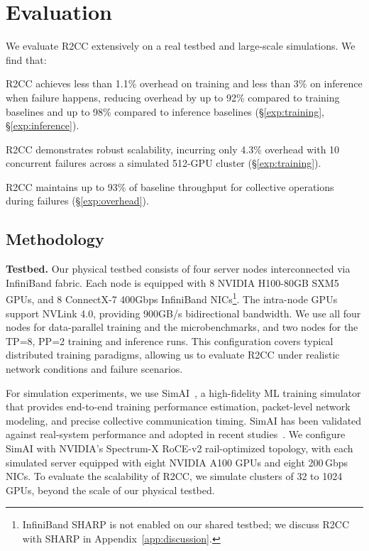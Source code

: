 \section{Evaluation}

We evaluate R2CC extensively on a real testbed and large-scale simulations. We find that:
\begin{packeditemize}
    \item R2CC achieves less than 1.1\% overhead on training and less than 3\% on inference when failure happens, reducing overhead by up to 92\% compared to training baselines and up to 98\% compared to inference baselines (§\ref{exp:training}, §\ref{exp:inference}).
    \item R2CC demonstrates robust scalability, incurring only 4.3\% overhead with 10 concurrent failures across a simulated 512-GPU cluster (§\ref{exp:training}).
    \item R2CC maintains up to 93\% of baseline throughput for collective operations during failures (§\ref{exp:overhead}).
\end{packeditemize}

\subsection{Methodology}
\label{sec:setup}
\textbf{Testbed.} Our physical testbed consists of four server nodes interconnected via InfiniBand fabric. Each node is equipped with 8 NVIDIA H100-80GB SXM5 GPUs, and 8 ConnectX-7 400Gbps InfiniBand NICs\footnote{InfiniBand SHARP is not enabled on our shared testbed; we discuss R2CC with SHARP in Appendix~\ref{app:discussion}.}. The intra-node GPUs support NVLink 4.0, providing 900GB/s bidirectional bandwidth. We use all four nodes for data-parallel training and the microbenchmarks, and two nodes for the TP=8, PP=2 training and inference runs. This configuration covers typical distributed training paradigms, allowing us to evaluate R2CC under realistic network conditions and failure scenarios.

For simulation experiments, we use SimAI~\cite{wang2025simai}, a high-fidelity ML training simulator that provides end-to-end training performance estimation, packet-level network modeling, and precise collective communication timing. SimAI has been validated against real-system performance and adopted in recent studies~\cite{qin2025phantora,gui2025accelerating,huang2025netzip}. We configure SimAI with NVIDIA's Spectrum-X RoCE-v2 rail-optimized topology, with each simulated server equipped with eight NVIDIA A100 GPUs and eight 200\,Gbps NICs. To evaluate the scalability of R2CC, we simulate clusters of 32 to 1024 GPUs, beyond the scale of our physical testbed.

